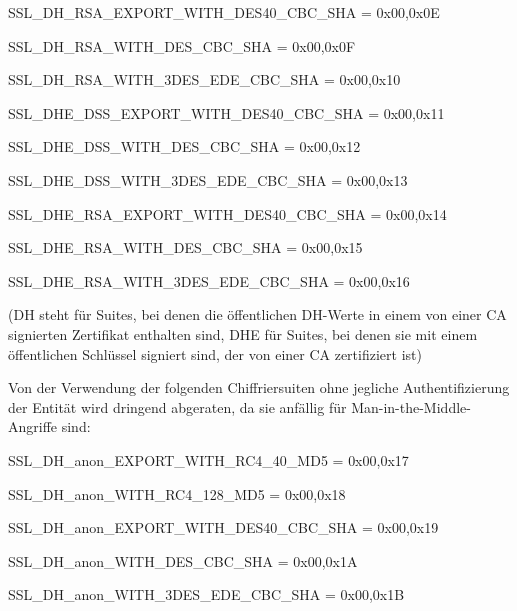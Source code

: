 \documentclass[a4paper]{article}
\begin{document}
\begin{multicols}{3}
\begin{itemize*}
\begin{itemize*}
\begin{itemize*}
                        \item SSL\_DH\_RSA\_EXPORT\_WITH\_DES40\_CBC\_SHA = { 0x00,0x0E }
                        \item SSL\_DH\_RSA\_WITH\_DES\_CBC\_SHA = { 0x00,0x0F }
                        \item SSL\_DH\_RSA\_WITH\_3DES\_EDE\_CBC\_SHA = { 0x00,0x10 }
                        \item SSL\_DHE\_DSS\_EXPORT\_WITH\_DES40\_CBC\_SHA = { 0x00,0x11 }
                        \item SSL\_DHE\_DSS\_WITH\_DES\_CBC\_SHA = { 0x00,0x12 }
                        \item SSL\_DHE\_DSS\_WITH\_3DES\_EDE\_CBC\_SHA = { 0x00,0x13 }
                        \item SSL\_DHE\_RSA\_EXPORT\_WITH\_DES40\_CBC\_SHA = { 0x00,0x14 }
                        \item SSL\_DHE\_RSA\_WITH\_DES\_CBC\_SHA = { 0x00,0x15 }
                        \item SSL\_DHE\_RSA\_WITH\_3DES\_EDE\_CBC\_SHA = { 0x00,0x16 }
                  \end{itemize*}
            \end{itemize*}
            (DH steht für Suites, bei denen die öffentlichen DH-Werte in einem von
            einer CA signierten Zertifikat enthalten sind, DHE für Suites, bei denen
            sie mit einem öffentlichen Schlüssel signiert sind, der von einer CA
            zertifiziert ist)
            \begin{itemize*}
                  \item Von der Verwendung der folgenden Chiffriersuiten ohne jegliche
                  Authentifizierung der Entität wird dringend abgeraten, da sie anfällig
                  für Man-in-the-Middle-Angriffe sind:
                  \begin{itemize*}
                        \item SSL\_DH\_anon\_EXPORT\_WITH\_RC4\_40\_MD5 = { 0x00,0x17 }
                        \item SSL\_DH\_anon\_WITH\_RC4\_128\_MD5 = { 0x00,0x18 }
                        \item SSL\_DH\_anon\_EXPORT\_WITH\_DES40\_CBC\_SHA = { 0x00,0x19 }
                        \item SSL\_DH\_anon\_WITH\_DES\_CBC\_SHA = { 0x00,0x1A }
                        \item SSL\_DH\_anon\_WITH\_3DES\_EDE\_CBC\_SHA = { 0x00,0x1B }
                  \end{itemize*}

\end{itemize*}
\end{itemize*}
\end{multicols}
\end{document}
